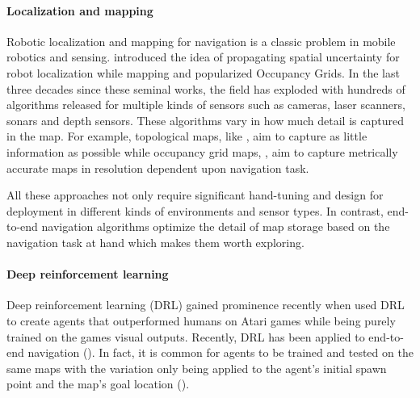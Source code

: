 \paragraph{Localization and mapping}
Robotic localization and mapping for navigation is a classic problem in  mobile robotics and sensing.
\cite{SmChIJRR1986} introduced the idea of propagating spatial uncertainty for robot localization while mapping and \cite{ElCOMPUTER1980} popularized Occupancy Grids.
In the last three decades since these seminal works, the field has exploded with hundreds of algorithms released for multiple kinds of sensors such as cameras, laser scanners, sonars and depth sensors.
These algorithms vary in how much detail is captured in the map. For example, topological maps, like \cite{KuCOGSCI1978}, aim to capture as little information as possible while occupancy grid maps, \cite{ElCOMPUTER1980}, aim to capture metrically accurate maps in resolution dependent upon navigation task.

All these approaches not only require significant hand-tuning and design for deployment in different kinds of environments and sensor types.
In contrast, end-to-end navigation algorithms optimize the detail of map storage based on the navigation task at hand which makes them worth exploring.

\paragraph{Deep reinforcement learning}
Deep reinforcement learning (DRL) gained prominence recently when \cite{MnKaSiNIPSDLW2013,MnKaSiNATURE2015} used DRL to create agents that outperformed humans on Atari games while being purely trained on the games visual outputs.
Recently, DRL has been applied to end-to-end navigation (\cite{OhChSiICML2016,MiPaViICLR2017,ChLaSaNIPS2016}).
In fact, it is common for agents to be trained and tested on the same maps with the variation only being applied to the agent's initial spawn point and the map's goal location (\cite{MiPaViICLR2017,ZhMoKoICRA2017,KuSaGaAPA2016}). 

